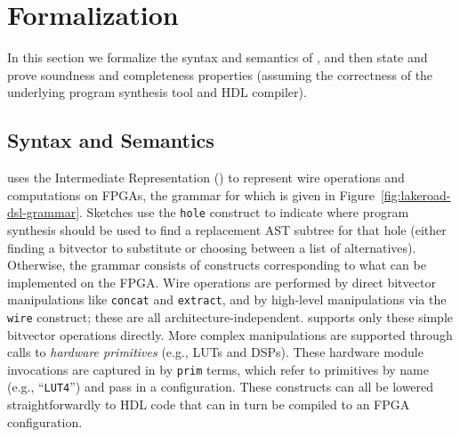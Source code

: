 \section{Formalization}
\label{sec:formalization}




In this section we formalize
  the syntax and semantics of \lr,
  and then state and prove
  soundness and completeness properties (assuming the correctness of the underlying program synthesis tool and HDL compiler).





\subsection{Syntax and Semantics}

%

%

\lr uses the \lr Intermediate Representation (\lrir) to represent
  wire operations and computations on FPGAs, the grammar for which is given in Figure~\ref{fig:lakeroad-dsl-grammar}.
Sketches use the \texttt{hole} construct
  to indicate where
  program synthesis should be used
  to find a replacement AST subtree
  for that hole 
  (either finding a bitvector to substitute or choosing between a list of alternatives).
Otherwise, the grammar consists
  of constructs corresponding to
  what can be implemented on the FPGA.
Wire operations are performed
  by direct
  bitvector manipulations
  like \texttt{concat}
  and \texttt{extract},
  and by high-level manipulations
  via the \texttt{wire} construct;
  these are all architecture-independent.
\lrir supports
  only these simple bitvector operations directly.
More complex manipulations
  are supported through calls 
  to \textit{hardware primitives} (e.g., LUTs and DSPs).
These hardware module invocations
  are captured in \lrir
  by \texttt{prim} terms,
  which refer to primitives
  by name (e.g., ``\texttt{LUT4}'')
  and pass in a configuration.
These constructs can all be lowered
  straightforwardly to HDL code
  that can in turn be compiled
  to an FPGA configuration.

